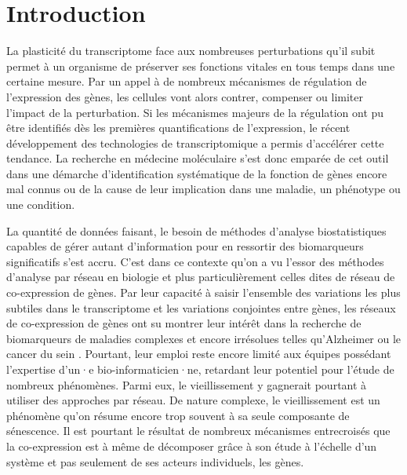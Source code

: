 \setcounter{chapter}{1}         %
\setcounter{section}{0}
\chapter*{Introduction}         %
\label{chapter:intro}

La plasticité du transcriptome face aux nombreuses perturbations qu'il subit permet à un organisme de préserver ses fonctions vitales en tous temps dans une certaine mesure. Par un appel à de nombreux mécanismes de régulation de l'expression des gènes, les cellules vont alors contrer, compenser ou limiter l'impact de la perturbation. Si les mécanismes majeurs de la régulation ont pu être identifiés dès les premières quantifications de l'expression, le récent développement des technologies de transcriptomique a permis d'accélérer cette tendance. La recherche en médecine moléculaire s'est donc emparée de cet outil dans une démarche d'identification systématique de la fonction de gènes encore mal connus ou de la cause de leur implication dans une maladie, un phénotype ou une condition.

La quantité de données faisant, le besoin de méthodes d'analyse biostatistiques capables de gérer autant d'information pour en ressortir des biomarqueurs significatifs s'est accru. C'est dans ce contexte qu'on a vu l’essor des méthodes d'analyse par réseau en biologie \cite{Barabasi2004} et plus particulièrement celles dites de réseau de co-expression de gènes. Par leur capacité à saisir l'ensemble des variations les plus subtiles dans le transcriptome et les variations conjointes entre gènes, les réseaux de co-expression de gènes ont su montrer leur intérêt dans la recherche de biomarqueurs de maladies complexes et encore irrésolues telles qu'Alzheimer \cite{Hu2020Nov} ou le cancer du sein \cite{Garcia-Cortes2020Jul}. Pourtant, leur emploi reste encore limité aux équipes possédant l'expertise d'un·e bio-informaticien·ne, retardant leur potentiel pour l'étude de nombreux phénomènes. Parmi eux, le vieillissement y gagnerait pourtant à utiliser des approches par réseau. De nature complexe, le vieillissement est un phénomène qu'on résume encore trop souvent à sa seule composante de sénescence. Il est pourtant le résultat de nombreux mécanismes entrecroisés que la co-expression est à même de décomposer grâce à son étude à l'échelle d'un système et pas seulement de ses acteurs individuels, les gènes.

